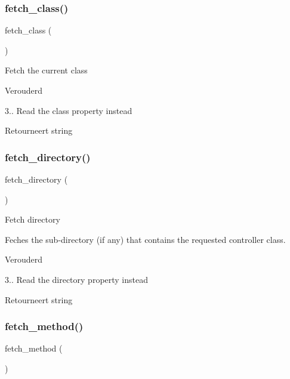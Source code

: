 \subsubsection{\texorpdfstring{fetch\_class()}{fetch\_class()}}
{\footnotesize\ttfamily fetch\+\_\+class (\begin{DoxyParamCaption}{ }\end{DoxyParamCaption})}

Fetch the current class

\begin{DoxyRefDesc}{Verouderd}
\item[\mbox{\hyperlink{deprecated__deprecated000003}{Verouderd}}]3.. Read the \textquotesingle{}class\textquotesingle{} property instead \end{DoxyRefDesc}
\begin{DoxyReturn}{Retourneert}
string 
\end{DoxyReturn}
\mbox{\label{class_c_i___router_a7a089f2cfae731dcc9e59a71d20208ef}} 
\subsubsection{\texorpdfstring{fetch\_directory()}{fetch\_directory()}}
{\footnotesize\ttfamily fetch\+\_\+directory (\begin{DoxyParamCaption}{ }\end{DoxyParamCaption})}

Fetch directory

Feches the sub-\/directory (if any) that contains the requested controller class.

\begin{DoxyRefDesc}{Verouderd}
\item[\mbox{\hyperlink{deprecated__deprecated000005}{Verouderd}}]3.. Read the \textquotesingle{}directory\textquotesingle{} property instead \end{DoxyRefDesc}
\begin{DoxyReturn}{Retourneert}
string 
\end{DoxyReturn}
\mbox{\label{class_c_i___router_ad408b28e3a095e7435f21e95d93e7714}} 
\subsubsection{\texorpdfstring{fetch\_method()}{fetch\_method()}}
{\footnotesize\ttfamily fetch\+\_\+method (\begin{DoxyParamCaption}{ }\end{DoxyParamCaption})}


